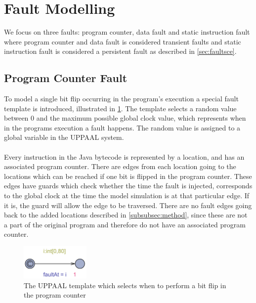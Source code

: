 \section{Fault Modelling}
We focus on three faults: program counter, data fault and static instruction fault where program counter and data fault is considered transient faults and static instruction fault is considered a persistent fault as described in \cref{sec:faultsce}.

\subsection{Program Counter Fault}

To model a single bit flip occurring in the program's execution a special fault template is introduced, illustrated in \cref{fig:faultTime}. The template selects a random value between $0$ and the maximum possible global clock value, which represents when in the programs execution a fault happens. The random value is assigned to a global variable in the UPPAAL system.\\\\
Every instruction in the Java bytecode is represented by a location, and has an associated program counter. There are edges from each location going to the locations which can be reached if one bit is flipped in the program counter. These edges have guards which check whether the time the fault is injected, corresponds to the global clock at the time the model simulation is at that particular edge. If it is, the guard will allow the edge to be traversed. There are no fault edges going back to the added locations described in \cref{subsubsec:method}, since these are not a part of the original program and therefore do not have an associated program counter.
\begin{figure}[H]
\centering
\includegraphics[width=0.3\textwidth]{figures/faulttemp.PNG}
\caption{The UPPAAL template which selects when to perform a bit flip in the program counter}
\label{fig:faultTime}
\end{figure}

